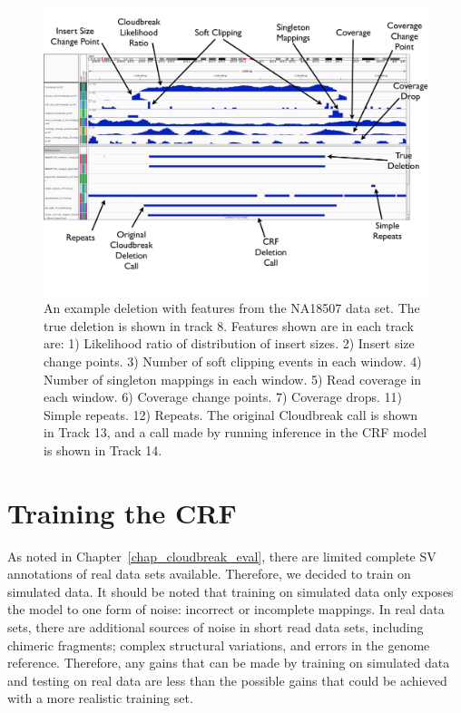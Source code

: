 \begin{figure}
\centering
\includegraphics[width=1\textwidth]{figures/true_example_with_features.pdf}
\caption[An example deletion with features from the NA18507 data set.]{An example deletion with features from the NA18507 data set. The true deletion is shown in track 8. Features shown are in each track are: 1) Likelihood ratio of distribution of insert sizes. 2) Insert size change points. 3) Number of soft clipping events in each window. 4) Number of singleton mappings in each window. 5) Read coverage in each window. 6) Coverage change points. 7) Coverage drops. 11) Simple repeats. 12) Repeats. The original Cloudbreak call is shown in Track 13, and a call made by running inference in the CRF model is shown in Track 14.}
\label{crf_features_example}
\end{figure}

\section{Training the CRF}

As noted in Chapter~\ref{chap_cloudbreak_eval}, there are limited complete SV annotations of real data sets available. Therefore, we decided to train on simulated data. It should be noted that training on simulated data only exposes the model to one form of noise: incorrect or incomplete mappings. In real data sets, there are additional sources of noise in short read data sets, including chimeric fragments; complex structural variations, and errors in the genome reference. Therefore, any gains that can be made by training on simulated data and testing on real data are less than the possible gains that could be achieved with a more realistic training set.

